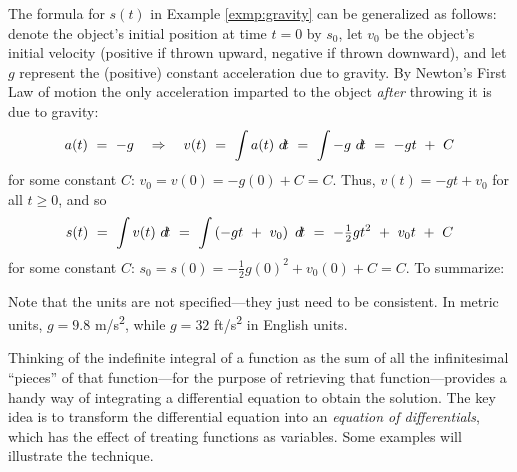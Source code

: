 The formula for $s(t)$ in Example \ref{exmp:gravity} can be generalized as
follows: denote the object's initial position at time $t=0$ by $s_0$,
let $v_0$ be the object's initial velocity (positive if thrown upward,
negative if thrown downward), and let $g$ represent the (positive) constant
acceleration due to gravity. By Newton's First Law of motion the only
acceleration imparted to the object \emph{after} throwing it is due to gravity:
\[
a(t) ~=~ -g \quad\Rightarrow\quad v(t) ~=~ \int a(t)~d\!t ~=~ \int -g~d\!t
~=~ -gt ~+~ C
\]
for some constant $C$:
$v_0 = v(0) = -g(0) + C = C$. Thus, $v(t) = -gt + v_0$ for all $t \ge 0$,
and so
\[
s(t) ~=~ \int v(t)~d\!t ~=~ \int \left(-gt ~+~ v_0\right)~d\!t ~=~
-\tfrac{1}{2}gt^2 ~+~ v_0t ~+~ C
\]
for some constant $C$:
$s_0 = s(0) = -\tfrac{1}{2}g(0)^2 + v_0(0) + C = C$. To summarize:

Note that the units are not specified---they just need to be
consistent. In metric units, $g = 9.8 $ m/s\textsuperscript{2}, while
$g = 32 $ ft/s\textsuperscript{2} in English units.

Thinking of the indefinite integral of a function as the sum of all the
infinitesimal ``pieces'' of that function---for the purpose of retrieving that
function---provides a handy way of integrating a differential equation to obtain
the solution. The key idea is to transform the differential equation into an
\emph{equation of differentials}, which has the effect of treating functions as
variables. Some examples will illustrate the technique.

